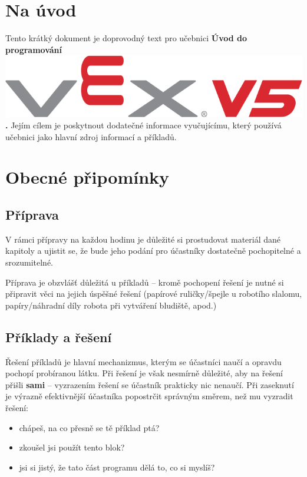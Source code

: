 \tableofcontents
\clearpage

\setcounter{secnumdepth}{0}

\section{Na úvod}
Tento krátký dokument je doprovodný text pro učebnici \textbf{Úvod do programování \includegraphics[height=0.65\baselineskip]{Images/vex-logo.png}.} Jejím cílem je poskytnout dodatečné informace vyučujícímu, který používá učebnici jako hlavní zdroj informací a příkladů.

\errata

\newpage

\section{Obecné připomínky}

\subsection{Příprava}
V rámci přípravy na každou hodinu je důležité si prostudovat materiál dané kapitoly a ujistit se, že bude jeho podání pro účastníky dostatečně pochopitelné a srozumitelné.

Příprava je obzvlášť důležitá u příkladů -- kromě pochopení řešení je nutné si připravit věci na jejich úspěšné řešení (papírové ruličky/špejle u robotího slalomu, papíry/náhradní díly robota při vytváření bludiště, apod.)

\subsection{Příklady a řešení}
Řešení příkladů je hlavní mechanizmus, kterým se účastníci naučí a opravdu pochopí probíranou látku. Při řešení je však nesmírně důležité, aby na řešení přišli \textbf{sami} -- vyzrazením řešení se účastník prakticky nic nenaučí. Při zaseknutí je výrazně efektivnější účastníka popostrčit správným směrem, než mu vyzradit řešení:
\begin{itemize}
	\item chápeš, na co přesně se tě příklad ptá?
	\item zkoušel jsi použít tento blok?
	\item jsi si jistý, že tato část programu dělá to, co si myslíš?
\end{itemize}

